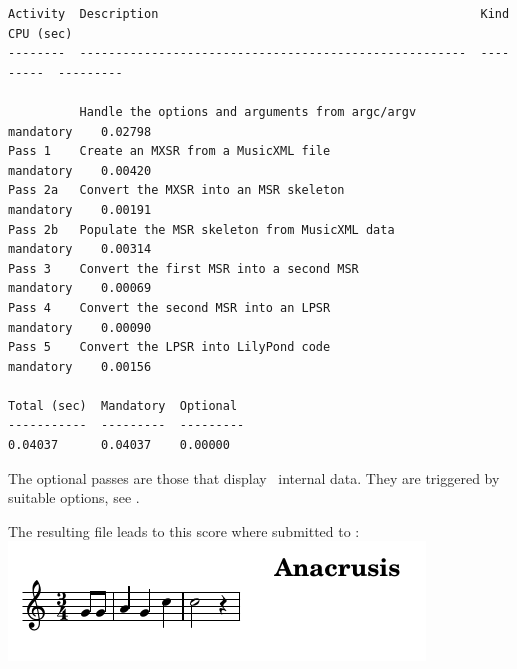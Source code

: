 \begin{lstlisting}[language=Terminal]
Activity  Description                                             Kind       CPU (sec)
--------  ------------------------------------------------------  ---------  ---------

          Handle the options and arguments from argc/argv         mandatory    0.02798
Pass 1    Create an MXSR from a MusicXML file                  mandatory    0.00420
Pass 2a   Convert the MXSR into an MSR skeleton                    mandatory    0.00191
Pass 2b   Populate the MSR skeleton from MusicXML data            mandatory    0.00314
Pass 3    Convert the first MSR into a second MSR                 mandatory    0.00069
Pass 4    Convert the second MSR into an LPSR                     mandatory    0.00090
Pass 5    Convert the LPSR into LilyPond code                 mandatory    0.00156

Total (sec)  Mandatory  Optional
-----------  ---------  ---------
0.04037      0.04037    0.00000
\end{lstlisting}

The optional passes are those that display \mf\ internal data. They are triggered by suitable options, see .

The resulting  file leads to this score where submitted to \lily:\\
\includegraphics[scale=1]{../mfgraphics/mfgraphicsAnacrusis.png}
